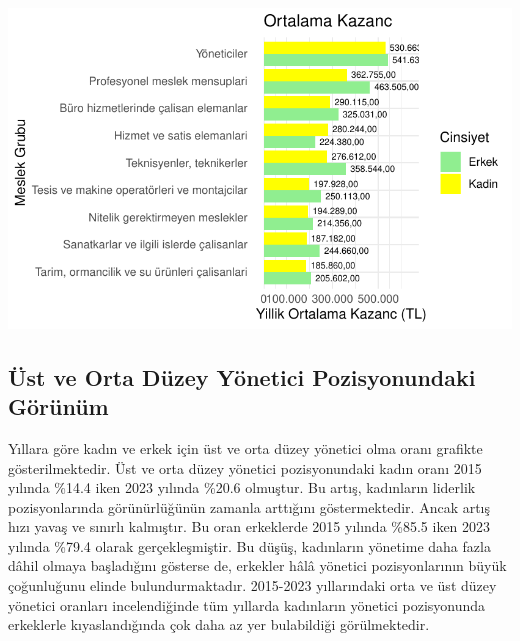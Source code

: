\documentclass[
  11pt,
  a4paper,
  DIV=11,
  numbers=noendperiod]{scrartcl}
\begin{document}
\includegraphics{project_files/figure-pdf/unnamed-chunk-5-1.pdf}

\subsection{Üst ve Orta Düzey Yönetici Pozisyonundaki
Görünüm}\label{uxfcst-ve-orta-duxfczey-yuxf6netici-pozisyonundaki-guxf6ruxfcnuxfcm}

Yıllara göre kadın ve erkek için üst ve orta düzey yönetici olma oranı
grafikte gösterilmektedir. Üst ve orta düzey yönetici pozisyonundaki
kadın oranı 2015 yılında \%14.4 iken 2023 yılında \%20.6 olmuştur. Bu
artış, kadınların liderlik pozisyonlarında görünürlüğünün zamanla
arttığını göstermektedir. Ancak artış hızı yavaş ve sınırlı kalmıştır.
Bu oran erkeklerde 2015 yılında \%85.5 iken 2023 yılında \%79.4 olarak
gerçekleşmiştir. Bu düşüş, kadınların yönetime daha fazla dâhil olmaya
başladığını gösterse de, erkekler hâlâ yönetici pozisyonlarının büyük
çoğunluğunu elinde bulundurmaktadır. 2015-2023 yıllarındaki orta ve üst
düzey yönetici oranları incelendiğinde tüm yıllarda kadınların yönetici
pozisyonunda erkeklerle kıyaslandığında çok daha az yer bulabildiği
görülmektedir.
\end{document}
